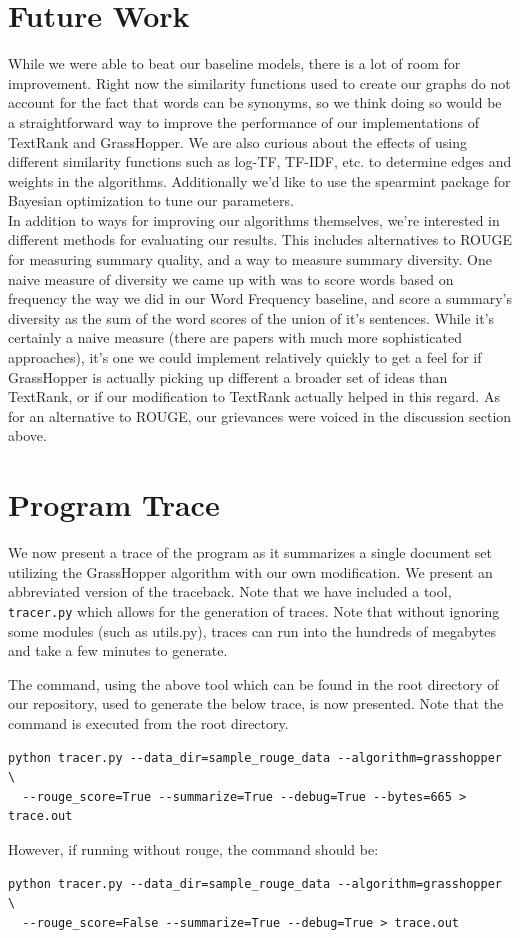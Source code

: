 \documentclass[11pt]{article}
\begin{document}
\section{Future Work}
While we were able to beat our baseline models, there is a lot of room for improvement. Right now the similarity functions used to create our graphs do not account for the fact that words can be synonyms, so we think doing so would be a straightforward way to improve the performance of our implementations of TextRank and GrassHopper. We are also curious about the effects of using different similarity functions such as log-TF, TF-IDF, etc. to determine edges and weights in the algorithms. Additionally we'd like to use the spearmint package for Bayesian optimization to tune our parameters. \\
In addition to ways for improving our algorithms themselves, we're interested in different methods for evaluating our results. This includes alternatives to ROUGE for measuring summary quality, and a way to measure summary diversity. One naive measure of diversity we came up with was to score words based on frequency the way we did in our Word Frequency baseline, and score a summary's diversity as the sum of the word scores of the union of it's sentences. While it's certainly a naive measure (there are papers with much more sophisticated approaches), it's one we could implement relatively quickly to get a feel for if GrassHopper is actually picking up different a broader set of ideas than TextRank, or if our modification to TextRank actually helped in this regard. As for an alternative to ROUGE, our grievances were voiced in the discussion section above.

\appendix

\section{Program Trace}
\label{sec:program_trace}

We now present a trace of the program as it summarizes a single document set utilizing the {\sc GrassHopper} algorithm with our own modification. We present an abbreviated version of the traceback. Note that we have included a tool, \verb|tracer.py| which allows for the generation of traces. Note that without ignoring some modules (such as utils.py), traces can run into the hundreds of megabytes and take a few minutes to generate.

The command, using the above tool which can be found in the root directory of our repository, used to generate the below trace, is now presented. Note that the command is executed from the root directory.
\begin{lstlisting}
python tracer.py --data_dir=sample_rouge_data --algorithm=grasshopper \
  --rouge_score=True --summarize=True --debug=True --bytes=665 > trace.out
\end{lstlisting}
However, if running without rouge, the command should be:
\begin{lstlisting}
python tracer.py --data_dir=sample_rouge_data --algorithm=grasshopper \
  --rouge_score=False --summarize=True --debug=True > trace.out
\end{lstlisting}
\end{document}
